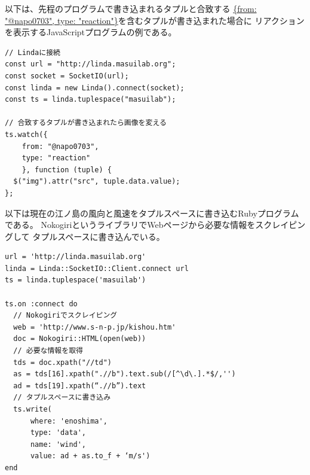 以下は、先程のプログラムで書き込まれるタプルと合致する
\url{{from: "@napo0703", type: "reaction"}}を含むタプルが書き込まれた場合に
リアクションを表示するJavaScriptプログラムの例である。

\vspace{2mm}
\begin{verbatim}
// Lindaに接続
const url = "http://linda.masuilab.org";
const socket = SocketIO(url);
const linda = new Linda().connect(socket);
const ts = linda.tuplespace("masuilab");

// 合致するタプルが書き込まれたら画像を変える
ts.watch({
    from: "@napo0703",
    type: "reaction"
    }, function (tuple) {
  $("img").attr("src", tuple.data.value);
};
\end{verbatim}
\vspace{2mm}

以下は現在の江ノ島の風向と風速をタプルスペースに書き込むRubyプログラムである。
NokogiriというライブラリでWebページから必要な情報をスクレイピングして
タプルスペースに書き込んでいる。

\vspace{2mm}
\begin{verbatim}
url = 'http://linda.masuilab.org'
linda = Linda::SocketIO::Client.connect url
ts = linda.tuplespace('masuilab')

ts.on :connect do
  // Nokogiriでスクレイピング
  web = 'http://www.s-n-p.jp/kishou.htm'
  doc = Nokogiri::HTML(open(web))
  // 必要な情報を取得
  tds = doc.xpath("//td")
  as = tds[16].xpath(".//b").text.sub(/[^\d\.].*$/,'')
  ad = tds[19].xpath(“.//b”).text
  // タプルスペースに書き込み
  ts.write(
      where: 'enoshima',
      type: 'data',
      name: 'wind',
      value: ad + as.to_f + ‘m/s')
end
\end{verbatim}
\vspace{2mm}
